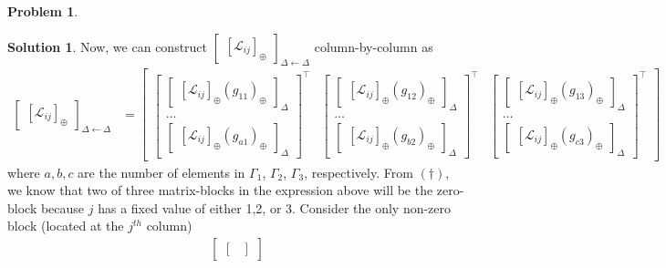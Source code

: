 \documentclass{article}
\theoremstyle{definition}
\newtheorem*{prob*}{Problem}
\newtheorem*{sln*}{Solution}
\newcommand{\lag}{\mathcal{L}}
\begin{document}
\begin{prob*}
\begin{sln*}
	Now, we can construct $\begin{bmatrix}[\lag_{ij}]_\oplus\end{bmatrix}_{\Delta\leftarrow\Delta}$ column-by-column as
	\begin{align*}
	\begin{bmatrix}[\lag_{ij}]_\oplus\end{bmatrix}_{\Delta\leftarrow\Delta}
	&=
	\begin{bmatrix}
	\begin{bmatrix}
	\begin{bmatrix}
	[\lag_{ij}]_\oplus(g_{11})_\oplus
	\end{bmatrix}_\Delta
	\\\dots\\
	\begin{bmatrix}
	[\lag_{ij}]_\oplus(g_{a1})_\oplus
	\end{bmatrix}_\Delta
	\end{bmatrix}^\top
	&
	\begin{bmatrix}
	\begin{bmatrix}
	[\lag_{ij}]_\oplus(g_{12})_\oplus
	\end{bmatrix}_\Delta
	\\\dots\\
	\begin{bmatrix}
	[\lag_{ij}]_\oplus(g_{b2})_\oplus
	\end{bmatrix}_\Delta
	\end{bmatrix}^\top
	&
	\begin{bmatrix}
	\begin{bmatrix}
	[\lag_{ij}]_\oplus(g_{13})_\oplus
	\end{bmatrix}_\Delta
	\\\dots\\
	\begin{bmatrix}
	[\lag_{ij}]_\oplus(g_{c3})_\oplus
	\end{bmatrix}_\Delta
	\end{bmatrix}^\top
	\end{bmatrix}
	\end{align*}
	where $a,b,c$ are the number of elements in $\Gamma_1$, $\Gamma_2$, $\Gamma_3$, respectively. From $(\dagger)$, we know that two of three matrix-blocks in the expression above will be the zero-block because $j$ has a fixed value of either 1,2, or 3. Consider the only non-zero block (located at the $j^{th}$ column)
	\begin{align*}
	\begin{bmatrix}
	\begin{bmatrix}

\end{bmatrix}
\end{bmatrix}
\end{align*}
\end{sln*}
\end{prob*}
\end{document}
